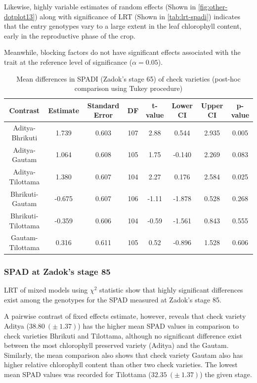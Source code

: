 \documentclass[12pt,oneside]{dukestatscithesis} %
\theoremstyle{definition}
\theoremstyle{definition}
\theoremstyle{definition}
\theoremstyle{remark}
\begin{document}
Likewise, highly variable estimates of random effects (Shown in
\ref{fig:other-dotplot13}) along with significance of LRT (Shown in
\ref{tab:lrt-spadi}) indicates that the entry genotypes vary to a large
extent in the leaf chlorophyll content, early in the reproductive phase
of the crop.

Meanwhile, blocking factors do not have significant effects associated
with the trait at the reference level of significance (\(\alpha=0.05\)).
\begin{table}[H]

\caption{\label{tab:other-meanconf-tab3}Mean differences in SPADI (Zadok's stage 65) of check varieties (post-hoc comparison using Tukey procedure)}
\centering
\begin{tabular}[t]{cccccccc}
\toprule
Contrast & Estimate & Standard Error & DF & t-value & Lower CI & Upper CI & p-value\\
\midrule
Aditya-Bhrikuti & 1.739 & 0.603 & 107 & 2.88 & 0.544 & 2.935 & 0.005\\
Aditya-Gautam & 1.064 & 0.608 & 105 & 1.75 & -0.140 & 2.269 & 0.083\\
Aditya-Tilottama & 1.380 & 0.607 & 104 & 2.27 & 0.176 & 2.584 & 0.025\\
Bhrikuti-Gautam & -0.675 & 0.607 & 106 & -1.11 & -1.878 & 0.528 & 0.268\\
Bhrikuti-Tilottama & -0.359 & 0.606 & 104 & -0.59 & -1.561 & 0.843 & 0.555\\
Gautam-Tilottama & 0.316 & 0.611 & 105 & 0.52 & -0.896 & 1.528 & 0.606\\
\bottomrule
\end{tabular}
\end{table}
\subsubsection{SPAD at Zadok's stage 85}\label{spad-at-zadoks-stage-85}

LRT of mixed models using \(\chi^2\) statistic show that highly
significant differences exist among the genotypes for the SPAD measured
at Zadok's stage 85.

A pairwise contrast of fixed effects estimate, however, reveals that
check variety Aditya (\(38.80\ (\pm\ 1.37)\)) has the higher mean SPAD
values in comparison to check varieties Bhrikuti and Tilottama, although
no significant difference exist between the most chlorophyll preserved
variety (Aditya) and the Gautam. Similarly, the mean comparison also
shows that check variety Gautam also has higher relative chlorophyll
content than other two check varieties. The lowest mean SPAD values was
recorded for Tilottama (\(32.35\ (\pm\ 1.37)\)) the given stage.
\end{document}
